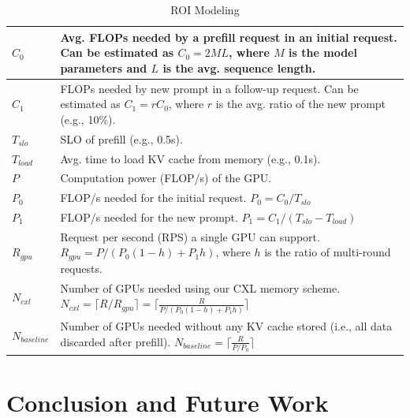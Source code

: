 \begin{table}[ht]
    \caption{ROI Modeling}
    \label{tab:roi}
    \centering
    \small %
    \begin{tabularx}{\columnwidth}{lX}
        \hline
        $C_{0}$         & Avg. FLOPs needed by a prefill request in an initial request. Can be estimated as $C_{0}=2ML$, where $M$ is the model parameters and $L$ is the avg. sequence length. \\ \hline
        $C_{1}$         & FLOPs needed by new prompt in a follow-up request. Can be estimated as $C_{1}=rC_0$, where $r$ is the avg. ratio of the new prompt (e.g., 10\%). \\ \hline
        $T_{slo}$       & SLO of prefill (e.g., 0.5s). \\ \hline
        $T_{load}$      & Avg. time to load KV cache from memory (e.g., 0.1s). \\ \hline
        $P$             & Computation power (FLOP/s) of the GPU. \\ \hline
        $P_0$           & FLOP/s needed for the initial request. $P_{0} = C_{0}/T_{slo}$ \\ \hline
        $P_1$           & FLOP/s needed for the new prompt. $P_{1}=C_{1}/(T_{slo}-T_{load})$  \\ \hline
        $R_{gpu}$       & Request per second (RPS) a single GPU can support. $R_{gpu} = P/(P_{0}(1-h)+P_{1}h)$, where $h$ is the ratio of multi-round requests. \\ \hline
        $N_{cxl}$       & Number of GPUs needed using our CXL memory scheme. $N_{cxl} = \lceil R/R_{gpu} \rceil = \lceil \frac{R}{P/(P_{0}(1-h)+P_{1}h)} \rceil$ \\ \hline
        $N_{baseline}$  & Number of GPUs needed without any KV cache stored (i.e., all data discarded after prefill). $N_{baseline} = \lceil \frac{R}{P/P_0} \rceil$\\ \hline
    \end{tabularx}
\end{table}


\section{Conclusion and Future Work}

